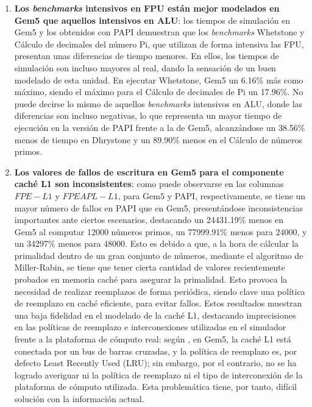 \begin{enumerate}%
    \item \textbf{Los \textit{benchmarks} intensivos en \ac{FPU} están mejor modelados en Gem5 que aquellos intensivos en ALU}: los tiempos de simulación en Gem5 y los obtenidos con PAPI demuestran que los \textit{benchmarks} Whetstone y Cálculo de decimales del número Pi, que utilizan de forma intensiva las FPU, presentan unas diferencias de tiempo menores. En ellos, los tiempos de simulación son incluso mayores al real, dando la sensación de un buen modelado de esta unidad. En ejecutar Whetstone, Gem5 un 6.16\% más como máximo, siendo el máximo para el Cálculo de decimales de Pi un 17.96\%. No puede decirse lo mismo de aquellos \textit{benchmarks} intensivos en \ac{ALU}, donde las diferencias son incluso negativas, lo que representa un mayor tiempo de ejecución en la versión de PAPI frente a la de Gem5, alcanzándose un 38.56\% menos de tiempo en Dhrystone y un 89.90\% menos en el Cálculo de números primos.

    \item \textbf{Los valores de fallos de escritura en Gem5 para el componente caché L1 son inconsistentes}: como puede observarse en las columnas $FPE-L1$ y $FPEAPL-L1$, para Gem5 y PAPI, respectivamente, se tiene un mayor número de fallos en PAPI que en Gem5, presentándose inconsistencias importantes ante ciertos escenarios, destacando un 24431.19\% menos en Gem5 al computar 12000 números primos, un 77999.91\% menos para 24000, y un 34297\% menos para 48000. Esto es debido a que, a la hora de cálcular la primalidad dentro de un gran conjunto de números, mediante el algoritmo de Miller-Rabin, se tiene que tener cierta cantidad de valores recientemente probados en memoria caché para asegurar la primalidad. Esto provoca la necesidad de realizar reemplazos de forma periódica, siendo clave una política de reemplazo en caché eficiente, para evitar fallos. Estos resultados muestran una baja fidelidad en el modelado de la caché L1, destacando imprecisiones en las políticas de reemplazo e interconexiones utilizadas en el simulador frente a la plataforma de cómputo real: según \cite{gem5-cache}, en Gem5, la caché L1 está conectada por un bus de barras cruzadas, y la política de reemplazo es, por defecto Least Recently Used (LRU); sin embargo, por el contrario, no se ha logrado averiguar ni la política de reemplazo ni el tipo de interconexión de la plataforma de cómputo utilizada. Esta problemática tiene, por tanto, difícil solución con la información actual.


\end{enumerate}
